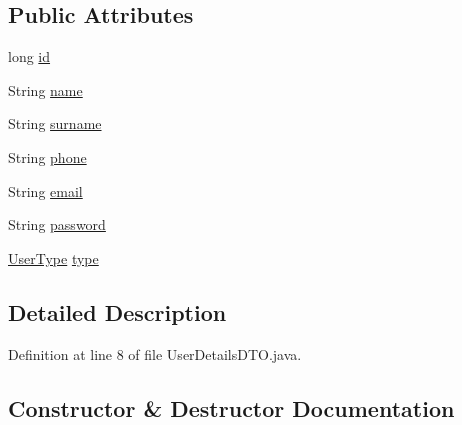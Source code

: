 \subsection*{Public Attributes}
\begin{DoxyCompactItemize}
\item 
long \mbox{\hyperlink{classes_1_1deusto_1_1server_1_1data_1_1_user_details_d_t_o_a5f54dc128e6dc54bcd889e220d2b635e}{id}}
\item 
String \mbox{\hyperlink{classes_1_1deusto_1_1server_1_1data_1_1_user_details_d_t_o_a5ed08eaa3f11b469cec38f4e00b1d770}{name}}
\item 
String \mbox{\hyperlink{classes_1_1deusto_1_1server_1_1data_1_1_user_details_d_t_o_a330072900fcfa1074bfd830396b42fd3}{surname}}
\item 
String \mbox{\hyperlink{classes_1_1deusto_1_1server_1_1data_1_1_user_details_d_t_o_a02645a69a61019b6ef72367320d6c2ca}{phone}}
\item 
String \mbox{\hyperlink{classes_1_1deusto_1_1server_1_1data_1_1_user_details_d_t_o_a669506e7fff75d8d85e335629441e1c6}{email}}
\item 
String \mbox{\hyperlink{classes_1_1deusto_1_1server_1_1data_1_1_user_details_d_t_o_a98c10832def6c14ba125dd9191789658}{password}}
\item 
\mbox{\hyperlink{enumes_1_1deusto_1_1server_1_1jdo_1_1_user_type}{User\+Type}} \mbox{\hyperlink{classes_1_1deusto_1_1server_1_1data_1_1_user_details_d_t_o_a0b9b66b5481b8d9bbb703238ec873f89}{type}}
\end{DoxyCompactItemize}


\subsection{Detailed Description}


Definition at line 8 of file User\+Details\+D\+T\+O.\+java.



\subsection{Constructor \& Destructor Documentation}
\mbox{\label{classes_1_1deusto_1_1server_1_1data_1_1_user_details_d_t_o_ac079ed52a730b1c55f989bfd41f51ddb}} 
